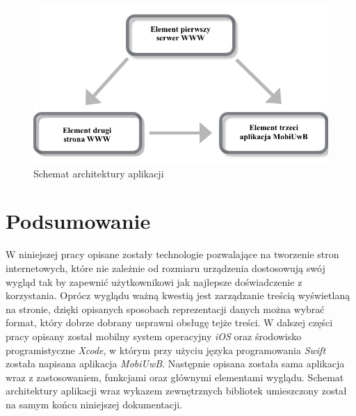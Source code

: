 \documentclass{iiuwb}
\begin{document}
\begin{figure}[!th]
\centering
\includegraphics[scale=.5]{image/architektura.png}
\caption{Schemat architektury aplikacji}
\label{fig:architektura}
\end{figure}
%
%

\cleardoublepage
\chapter*{Podsumowanie}                        
\label{cha:Podsumownanie}                       
W niniejszej pracy opisane zostały technologie pozwalające na tworzenie stron internetowych, które nie zależnie od rozmiaru urządzenia dostosowują swój wygląd tak by zapewnić użytkownikowi jak najlepsze doświadczenie z korzystania. Oprócz wyglądu ważną kwestią jest zarządzanie treścią wyświetlaną na stronie, dzięki opisanych sposobach reprezentacji danych można wybrać format, który dobrze dobrany usprawni obsługę tejże treści. W dalszej części pracy opisany został mobilny system operacyjny \textit{iOS} oraz środowisko programistyczne \textit{Xcode}, w którym przy użyciu języka programowania \textit{Swift} została napisana aplikacja \textit{MobiUwB}. Następnie opisana została sama aplikacja wraz z zastosowaniem, funkcjami oraz głównymi elementami wyglądu. Schemat architektury aplikacji wraz wykazem zewnętrznych bibliotek umieszczony został na samym końcu niniejszej dokumentacji.
\end{document}
